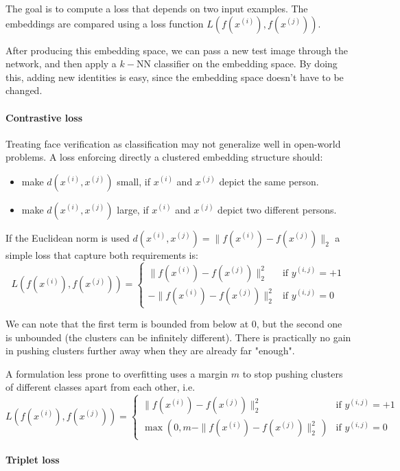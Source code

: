 The goal is to compute a loss that depends on two input examples.
The embeddings are compared using a loss function $L(f(x^{(i)}), f(x^{(j)}))$.

After producing this embedding space, we can pass a new test image through the network, and then apply a $k-$NN classifier on the embedding space.
By doing this, adding new identities is easy, since the embedding space doesn't have to be changed.

\paragraph{Contrastive loss}

Treating face verification as classification may not generalize well in open-world problems.
A loss enforcing directly a clustered embedding structure should:
\begin{itemize}
  \item make $d(x^{(i)}, x^{(j)})$ small, if $x^{(i)}$ and $x^{(j)}$ depict the same person.
  \item make $d(x^{(i)}, x^{(j)})$ large, if $x^{(i)}$ and $x^{(j)}$ depict two different persons.
\end{itemize}

If the Euclidean norm is used $d(x^{(i)}, x^{(j)}) = \|f(x^{(i)}) - f(x^{(j)})\|_2$ a simple loss that capture both requirements is:
$$
L\left(f(x^{(i)}), f(x^{(j)})\right) = 
\begin{cases}
\|f(x^{(i)}) - f(x^{(j)})\|_2^2 & \text{if } y^{(i,j)} = +1 \\
-\|f(x^{(i)}) - f(x^{(j)})\|_2^2 & \text{if } y^{(i,j)} = 0
\end{cases}
$$

We can note that the first term is bounded from below at 0, but the second one is unbounded (the clusters can be infinitely different).
There is practically no gain in pushing clusters further away when they are already far "enough".

A formulation less prone to overfitting uses a margin $m$ to stop pushing clusters of different classes apart from each other, i.e.
$$
L\left(f(x^{(i)}), f(x^{(j)})\right) = 
\begin{cases}
\|f(x^{(i)}) - f(x^{(j)})\|_2^2 & \text{if } y^{(i,j)} = +1 \\
\max (0, m - \|f(x^{(i)}) - f(x^{(j)})\|_2^2 \,) & \text{if } y^{(i,j)} = 0
\end{cases}
$$

\paragraph{Triplet loss}

